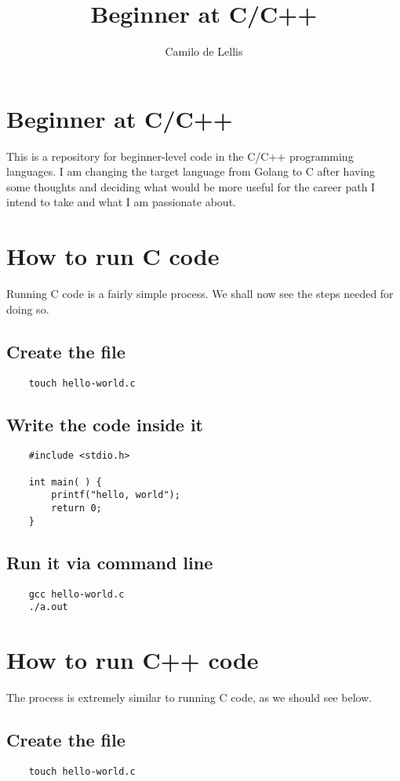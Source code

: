 \documentclass{article}
\title{Beginner at C/C++}
\author{Camilo de Lellis}
\begin{document}
\maketitle
\tableofcontents

\section{Beginner at C/C++}
This is a repository for beginner-level code in the C/C++ programming languages. I am changing the target language from Golang to C after having some thoughts and deciding what would be more useful for the career path I intend to take and what I am passionate about.

\section{How to run C code}
Running C code is a fairly simple process. We shall now see the steps needed for doing so.

\subsection{Create the file}
\begin{verbatim}
    touch hello-world.c
\end{verbatim}

\subsection{Write the code inside it}
\begin{verbatim}
    #include <stdio.h>

    int main( ) {
        printf("hello, world");
        return 0;
    }
\end{verbatim}

\subsection{Run it via command line}
\begin{verbatim}
    gcc hello-world.c 
    ./a.out 
\end{verbatim}

\section{How to run C++ code}
The process is extremely similar to running C code, as we should see below.

\subsection{Create the file}
\begin{verbatim}
    touch hello-world.c
\end{verbatim}
\end{document}

